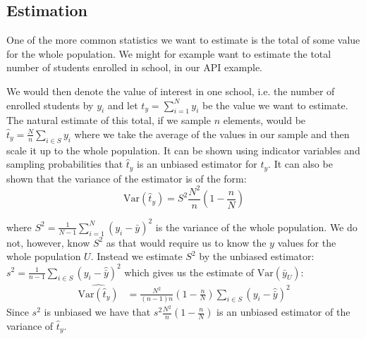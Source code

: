 \documentclass{article}
\begin{document}
\subsection{Estimation}

One of the more common statistics we want to estimate is the total of some value
for the whole population. We might for example want to estimate the total number
of students enrolled in school, in our API example.

We would then denote the value of interest in one school, i.e. the number of
enrolled students by \(y_i\) and let
\(
  t_y = \sum_{i = 1}^{N} y_i
\)
be the value we want to estimate.
The natural estimate of this total, if we sample \(n\) elements, would be
\(
\hat{t}_y = \frac{N}{n}\sum_{i \in S} y_i
\)
where we take the average of the values in our sample and then scale it up to
the whole population.
It can be shown using indicator variables and sampling probabilities that
\(\hat{t}_y\) is an unbiased estimator for \(t_y\).
%
%
It can also be shown that the variance of the estimator is of the form:
\begin{equation*}
\mathrm{Var} \left( \hat{t}_y \right) = S^2\frac{N^2}{n} \left( 1 - \frac{n}{N}
\right)
\end{equation*}

where
\(
S^2 = \frac{1}{N - 1} \sum_{i = 1}^N (y_i - \bar{y})^2
\)
is the variance of the whole population.
We do not, however, know \(S^2\) as that would require us to know the \(y\) values
for the whole population \(U\). Instead we estimate \(S^2\) by the unbiased estimator:
\(
  s^2 = \frac{1}{n - 1} \sum_{i \in S} \left( y_i - \hat{\bar{y}} \right)^2
\)
which gives us the estimate of \(\mathrm{Var}(\bar{y}_U)\):
\begin{align*}
  \widehat{\mathrm{Var}(\hat{t}_y)}
  &=\frac{N^2}{\left( n - 1 \right)n} \left( 1 - \frac{n}{N} \right) \sum_{i \in S} \left( y_i - \hat{\bar{y}} \right)^2
\end{align*}
Since \(s^2\) is unbiased we have that \(s^2\frac{N^2}{n} \left( 1 - \frac{n}{N}
\right)\) is an unbiased estimator of the variance of \(\hat{t}_y\).
\end{document}
